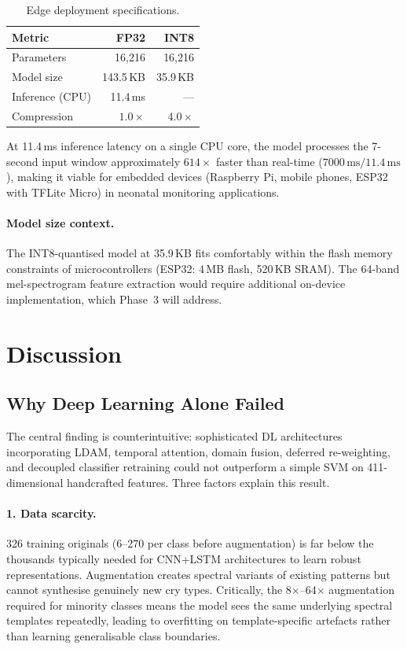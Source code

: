\documentclass[11pt,a4paper]{article}
\begin{document}
\begin{table}[H]
\centering
\caption{Edge deployment specifications.}
\label{tab:edge}
\begin{tabular}{lrr}
\toprule
\textbf{Metric} & \textbf{FP32} & \textbf{INT8} \\
\midrule
Parameters      & 16,216 & 16,216 \\
Model size      & 143.5\,KB & 35.9\,KB \\
Inference (CPU) & 11.4\,ms & --- \\
Compression     & $1.0\times$ & $4.0\times$ \\
\bottomrule
\end{tabular}
\end{table}

At 11.4\,ms inference latency on a single CPU core, the model processes
the 7-second input window approximately $614\times$ faster than
real-time ($7000\,\text{ms} / 11.4\,\text{ms}$), making it viable
for embedded devices (Raspberry Pi, mobile phones, ESP32 with
TFLite Micro) in neonatal monitoring applications.

\paragraph{Model size context.}
The INT8-quantised model at 35.9\,KB fits comfortably within the
flash memory constraints of microcontrollers (ESP32: 4\,MB flash,
520\,KB SRAM). The 64-band mel-spectrogram feature extraction would
require additional on-device implementation, which Phase~3 will address.

\section{Discussion}
\label{sec:discussion}

\subsection{Why Deep Learning Alone Failed}

The central finding is counterintuitive: sophisticated DL architectures
incorporating LDAM, temporal attention, domain fusion, deferred
re-weighting, and decoupled classifier retraining could not outperform a
simple SVM on 411-dimensional handcrafted features. Three factors
explain this result.

\paragraph{1. Data scarcity.}
326 training originals (6--270 per class before augmentation) is far
below the thousands typically needed for CNN+LSTM architectures to learn
robust representations. Augmentation creates spectral variants of
existing patterns but cannot synthesise genuinely new cry types.
Critically, the 8$\times$--64$\times$ augmentation required for
minority classes means the model sees the same underlying spectral
templates repeatedly, leading to overfitting on template-specific
artefacts rather than learning generalisable class boundaries.
\end{document}
